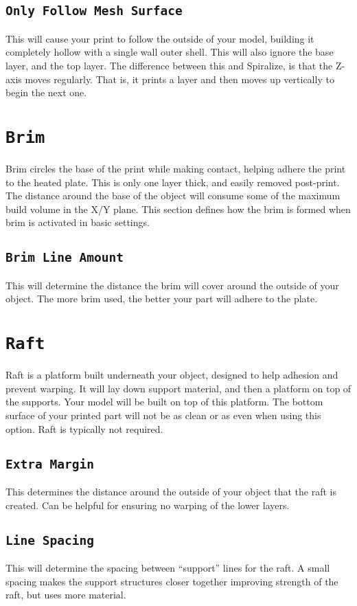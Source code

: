 \subsection{\texttt{Only Follow Mesh Surface}}
This will cause your print to follow the outside of your model, building it completely hollow with a single wall outer shell. This will also ignore the base layer, and the top layer. The difference between this and Spiralize, is that the Z-axis moves regularly. That is, it prints a layer and then moves up vertically to begin the next one.

\section{\texttt{Brim}}
Brim circles the base of the print while making contact, helping adhere the print to the heated plate. This is only one layer thick, and easily removed post-print. The distance around the base of the object will consume some of the maximum build volume in the X/Y plane. This section defines how the brim is formed when brim is activated in basic settings.

\subsection{\texttt{Brim Line Amount}}
This will determine the distance the brim will cover around the outside of your object. The more brim used, the better your part will adhere to the plate. 

\section{\texttt{Raft}}
Raft is a platform built underneath your object, designed to help adhesion and prevent warping. It will lay down support material, and then a platform on top of the supports. Your model will be built on top of this platform. The bottom surface of your printed part will not be as clean or as even when using this option. Raft is typically not required.

\subsection{\texttt{Extra Margin}}
This determines the distance around the outside of your object that the raft is created. Can be helpful for ensuring no warping of the lower layers.

\subsection{\texttt{Line Spacing}}
This will determine the spacing between “support” lines for the raft. A small spacing makes the support structures closer together improving strength of the raft, but uses more material.

